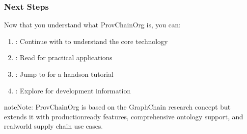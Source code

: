 \documentclass[letterpaper,10pt,english]{sphinxmanual}
\begin{document}
\subsubsection{Next Steps}
\label{\detokenize{foundational/intro-to-provchainorg:next-steps}}
\sphinxAtStartPar
Now that you understand what ProvChainOrg is, you can:
\begin{enumerate}
%
\item {} 
\sphinxAtStartPar
{}: Continue with {\hyperref[\detokenize{foundational/intro-to-rdf-blockchain::doc}]{}} to understand the core technology

\item {} 
\sphinxAtStartPar
{}: Read {\hyperref[\detokenize{foundational/intro-to-supply-chain-traceability::doc}]{}} for practical applications

\item {} 
\sphinxAtStartPar
{}: Jump to {\hyperref[\detokenize{tutorials/first-supply-chain::doc}]{}} for a hands\sphinxhyphen{}on tutorial

\item {} 
\sphinxAtStartPar
{}: Explore {\hyperref[\detokenize{stack/intro-to-stack::doc}]{}} for development information

\end{enumerate}

\begin{sphinxadmonition}{note}{Note:}
\sphinxAtStartPar
ProvChainOrg is based on the GraphChain research concept but extends it with production\sphinxhyphen{}ready features, comprehensive ontology support, and real\sphinxhyphen{}world supply chain use cases.
\end{sphinxadmonition}
\end{document}
